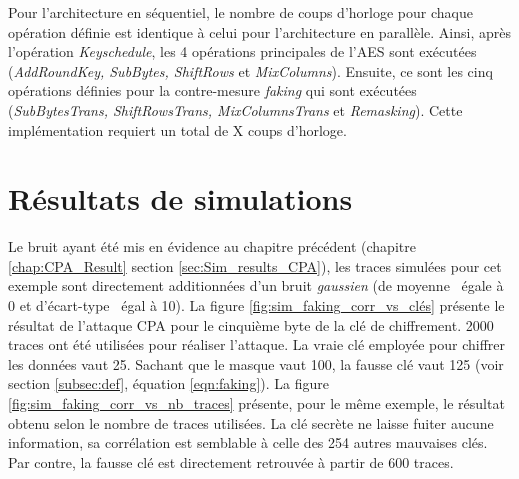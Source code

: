 \documentclass[oneside]{book}
\begin{document}
Pour l'architecture en séquentiel, le nombre de coups d'horloge pour chaque opération définie est identique à celui pour l'architecture en parallèle. Ainsi, après l'opération \textit{Keyschedule}, les 4 opérations principales de l'AES sont exécutées (\textit{AddRoundKey, SubBytes, ShiftRows} et \textit{MixColumns}). Ensuite, ce sont les cinq opérations définies pour la contre-mesure \textit{faking} qui sont exécutées (\textit{SubBytesTrans, ShiftRowsTrans, MixColumnsTrans} et \textit{Remasking}). Cette implémentation requiert un total de X coups d'horloge.



\section{Résultats de simulations}
\label{sec:Sim_results_Faking}

Le bruit ayant été mis en évidence au chapitre précédent (chapitre \ref{chap:CPA_Result} section \ref{sec:Sim_results_CPA}), les traces simulées pour cet exemple sont directement additionnées d'un bruit \textit{gaussien} (de moyenne \mu \ égale à 0 et d'écart-type \sigma \ égal à 10). La figure \ref{fig:sim_faking_corr_vs_clés} présente le résultat de l'attaque CPA pour le cinquième byte de la clé de chiffrement. 2000 traces ont été utilisées pour réaliser l'attaque. La vraie clé employée pour chiffrer les données vaut 25. Sachant que le masque vaut 100, la fausse clé vaut 125 (voir section \ref{subsec:def}, équation \ref{eqn:faking}). La figure \ref{fig:sim_faking_corr_vs_nb_traces} présente, pour le même exemple, le résultat obtenu selon le nombre de traces utilisées. La clé secrète ne laisse fuiter aucune information, sa corrélation est semblable à celle des 254 autres mauvaises clés. Par contre, la fausse clé est directement retrouvée à partir de 600 traces.
\end{document}
